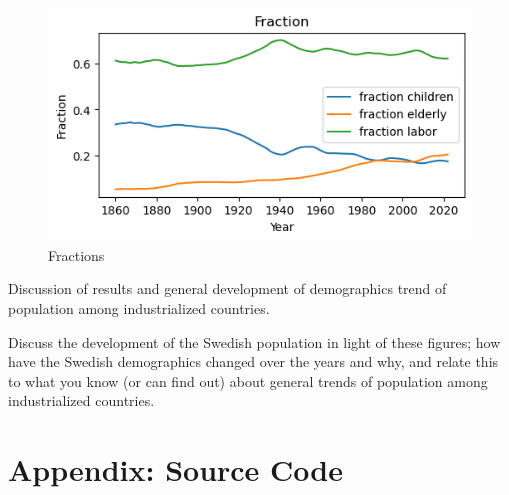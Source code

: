 \documentclass[a4paper]{article}
\begin{document}
\begin{figure}[h]
  \begin{center}
    \includegraphics[width=\textwidth]{fractions.png}
    \caption{Fractions}
    \label{fig:fractions}
  \end{center}
\end{figure}


Discussion of results and general development of demographics trend of population
among industrialized countries.

Discuss the development of the Swedish population in light of these figures; how have the Swedish demographics changed over the years and why, and relate this to what you know (or can find out) about general trends of population among industrialized countries.



\printbibliography

\section*{Appendix: Source Code}

\end{document}
